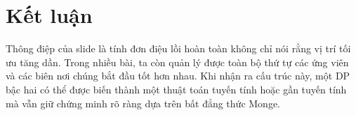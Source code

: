 \documentclass[11pt]{article}
\begin{document}
\section{Kết luận}

Thông điệp của slide là tính đơn điệu lồi hoàn toàn không chỉ nói rằng vị trí
tối ưu tăng dần. Trong nhiều bài, ta còn quản lý được toàn bộ thứ tự các
ứng viên và các biên nơi chúng bắt đầu tốt hơn nhau. Khi nhận ra cấu trúc
này, một DP bậc hai có thể được biến thành một thuật toán tuyến tính hoặc
gần tuyến tính mà vẫn giữ chứng minh rõ ràng dựa trên bất đẳng thức Monge.
\end{document}
